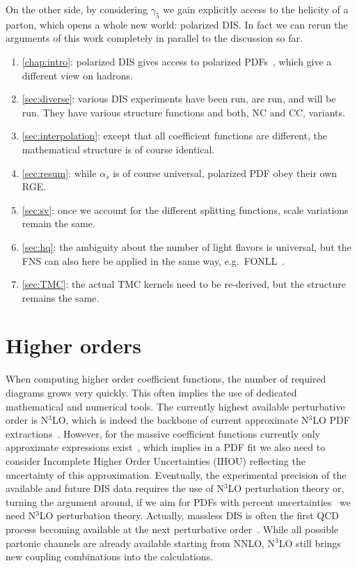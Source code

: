 On the other side, by considering $\gamma_5$ we gain explicitly access to the helicity of a parton, which opens a whole new world: polarized DIS.
In fact we can rerun the arguments of this work completely in parallel to the discussion so far.
\begin{enumerate}
    \item \cref{chap:intro}: polarized DIS gives access to polarized PDFs~\cite{Cruz-Martinez:2025ahf,Nocera:2026est}, which give a different view on hadrons.
    \item \cref{sec:diverse}: various DIS experiments have been run, are run, and will be run. They have various structure functions and both, NC and CC, variants.
    \item \cref{sec:interpolation}: except that all coefficient functions are different, the mathematical structure is of course identical.
    \item \cref{sec:resum}: while $\alpha_s$ is of course universal, polarized PDF obey their own RGE.
    \item \cref{sec:sv}: once we account for the different splitting functions, scale variations remain the same.
    \item \cref{sec:hq}: the ambiguity about the number of light flavors is universal, but the FNS can also here be applied in the same way, e.g.\ FONLL~\cite{Hekhorn:2024tqm}.
    \item \cref{sec:TMC}: the actual TMC kernels need to be re-derived, but the structure remains the same.
\end{enumerate}

\section{Higher orders}
When computing higher order coefficient functions, the number of required diagrams grows very quickly.
This often implies the use of dedicated mathematical and numerical tools.
The currently highest available perturbative order is N$^3$LO, which is indeed the backbone of current approximate N$^3$LO PDF extractions~\cite{NNPDF:2024nan,McGowan:2022nag}.
However, for the massive coefficient functions currently only approximate expressions exist~\cite{Barontini:2026drp}, which implies in a PDF fit we also need to consider Incomplete Higher Order Uncertainties (IHOU) reflecting the uncertainty of this approximation.
Eventually, the experimental precision of the available and future DIS data requires the use of N$^3$LO perturbation theory or, turning the argument around, if we aim for PDFs with percent uncertainties~\cite{NNPDF:2021njg} we need N$^3$LO perturbation theory.
Actually, massless DIS is often the first QCD process becoming available at the next perturbative order~\cite{Basdew-Sharma:2021jhx}.
While all possible partonic channels are already available starting from NNLO, N$^3$LO still brings new coupling combinations into the calculations.

